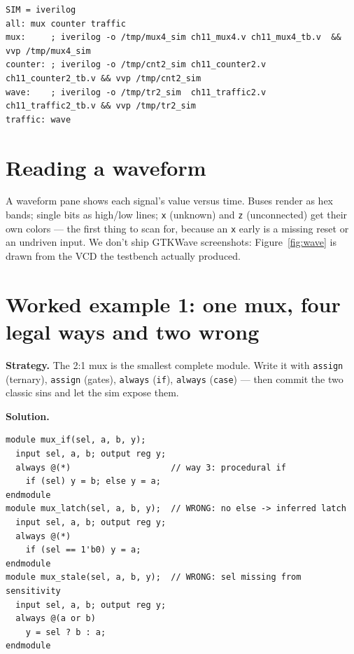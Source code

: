\begin{lstlisting}[caption={\ttfamily code/ch11\_Makefile --- the sim
targets used throughout this book.},label={lst:mk}]
SIM = iverilog
all: mux counter traffic
mux:     ; iverilog -o /tmp/mux4_sim ch11_mux4.v ch11_mux4_tb.v  && vvp /tmp/mux4_sim
counter: ; iverilog -o /tmp/cnt2_sim ch11_counter2.v ch11_counter2_tb.v && vvp /tmp/cnt2_sim
wave:    ; iverilog -o /tmp/tr2_sim  ch11_traffic2.v ch11_traffic2_tb.v && vvp /tmp/tr2_sim
traffic: wave
\end{lstlisting}

\section{Reading a waveform}\label{sec:wave}

A waveform pane shows each signal's value versus time. Buses render as
hex bands; single bits as high/low lines; \texttt{x} (unknown) and
\texttt{z} (unconnected) get their own colors --- the first thing to
scan for, because an \texttt{x} early is a missing reset or an
undriven input. We don't ship GTKWave screenshots: Figure~\ref{fig:wave}
is drawn from the VCD the testbench actually produced.

\section{Worked example 1: one mux, four legal ways and two wrong}
\label{sec:we-mux4}

\textbf{Strategy.} The 2:1 mux is the smallest complete module. Write it
with \texttt{assign} (ternary), \texttt{assign} (gates),
\texttt{always} (\texttt{if}), \texttt{always} (\texttt{case}) --- then
commit the two classic sins and let the sim expose them.

\textbf{Solution.}
\begin{lstlisting}[caption={\ttfamily code/ch11\_mux4.v --- four legal
muxes plus the two wrong ones (abridged).},label={lst:mux4}]
module mux_if(sel, a, b, y);
  input sel, a, b; output reg y;
  always @(*)                    // way 3: procedural if
    if (sel) y = b; else y = a;
endmodule
module mux_latch(sel, a, b, y);  // WRONG: no else -> inferred latch
  input sel, a, b; output reg y;
  always @(*)
    if (sel == 1'b0) y = a;
endmodule
module mux_stale(sel, a, b, y);  // WRONG: sel missing from sensitivity
  input sel, a, b; output reg y;
  always @(a or b)
    y = sel ? b : a;
endmodule
\end{lstlisting}

